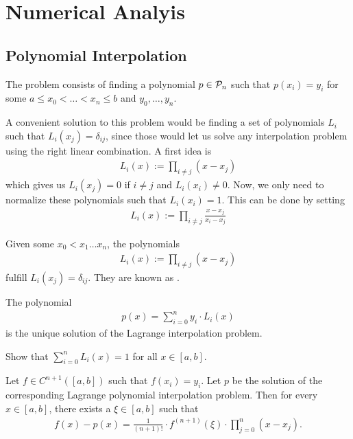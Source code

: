 \chapter{Numerical Analyis}
\section{Polynomial Interpolation}
\begin{definition}
	The  problem consists of finding a polynomial $p \in \mathcal{P}_n$ such that $p(x_i) = y_i$ for some $a \leq x_0 < \hdots < x_n \leq b$ and $y_0, \hdots, y_n$.
\end{definition}
A convenient solution to this problem would be finding a set of polynomials $L_i$ such that $L_i(x_j) = \delta_{ij}$, since those would let us solve any interpolation problem using the right linear combination. A first idea is
\begin{align*}
	L_i(x) := \prod_{i \neq j} (x - x_j)
\end{align*}
which gives us $L_i(x_j) = 0$ if $i \neq j$ and $L_i(x_i) \neq 0$. Now, we only need to normalize these polynomials such that $L_i(x_i) = 1$. This can be done by setting
\begin{align*}
	L_i(x) := \prod_{i \neq j} \frac{x - x_j}{x_i - x_j}
\end{align*}
\begin{importanttheorem}{}{}
	Given some $x_0 < x_1 \hdots x_n$, the polynomials
	\begin{align*}
		L_i(x) := \prod_{i \neq j} (x - x_j)
	\end{align*}
	fulfill $L_i(x_j) = \delta_{ij}$. They are known as .
\end{importanttheorem}
\begin{corollary}
	The polynomial 
	\begin{align*}
		p(x) = \sum_{i = 0}^n y_i \cdot L_i(x)
	\end{align*}
	is the unique solution of the Lagrange interpolation problem.
\end{corollary}
\begin{exercise}
	Show that $\sum_{i = 0}^n L_i(x) = 1$ for all $x \in [a,b]$.
\end{exercise}
\begin{theorem}
	Let $f \in C^{n+1}([a,b])$ such that $f(x_i) = y_i$. Let $p$ be the solution of the corresponding Lagrange polynomial interpolation problem. Then for every $x \in [a,b]$, there exists a $\xi \in [a,b]$ such that
	\begin{align*}
		f(x) - p(x) = \frac{1}{(n+1)!} \cdot f^{(n+1)}(\xi) \cdot \prod_{j = 0}^n (x - x_j).
	\end{align*}
\end{theorem}
